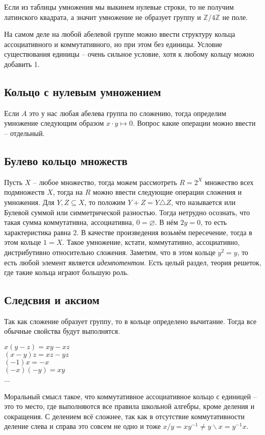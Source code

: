 Если из таблицы умножения мы выкинем нулевые строки, то не получим латинского
квадрата, а значит умножение не образует группу и $\mathbb{Z}/4\mathbb{Z}$ не
поле.

На самом деле на любой абелевой группе можно ввести структуру кольца
ассоциативного и коммутативного, но при этом без единицы. Условие существования
единицы – очень сильное условие, хотя к любому кольцу можно добавить 1.

\subsection{Кольцо с нулевым умножением}
Если $A$ это у нас любая абелева группа по сложению, тогда определим умножение
следующим образом $x\cdot y\mapsto 0$. Вопрос какие операции можно ввести –
отдельный.

\subsection{Булево кольцо множеств}
Пусть $X$ – любое множество, тогда можем рассмотреть $R=2^X$ множество всех
подмножеств $X$, тогда на $R$ можно ввести следующие операции сложения и
умножения. Для $Y,Z\subseteq X$, то положим $Y+Z=Y\triangle Z$, что называется
или Булевой суммой или симметрической разностью. Тогда нетрудно осознать, что
такая сумма коммутативна, ассоциативна, $0=\varnothing$. В нём $2y=0$, то есть
характеристика равна 2. В качестве произведения возьмём пересечение, тогда в
этом кольце $1=X$. Такое умножение, кстати, коммутативно, ассоциативно,
дистрибутивно относительно сложения. Заметим, что в этом кольце $y^2=y$, то
есть любой элемент является \emph{идемпотентом}. Eсть целый раздел, теория
решеток, где такие кольца играют большую роль.

\subsection{Следсвия и аксиом}
Так как сложение образует группу, то в кольце определено вычитание. Тогда все
обычные свойства будут выполнятся.
\begin{center}
    $x(y-z) = xy-xz$\\
    $(x-y)z = xz-yz$\\
    $(-1)x = -x$\\
    $(-x)(-y) = xy$\\
    ...
\end{center}
Моральный смысл такое, что коммутативное ассоциативное кольцо с единицей – это
то место, где выполняются все правила школьной алгебры, кроме деления и
сокращения. С делением всё сложнее, так как в отсутствие коммутативности деление
слева и справа это совсем не одно и тоже $x/y=xy^{-1}\neq y\backslash x=y^{-1}x$.

